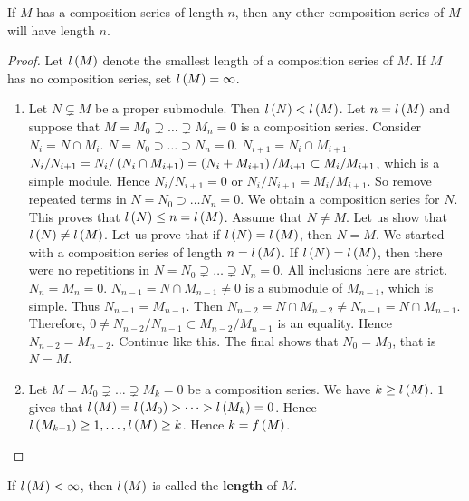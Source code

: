 \begin{proposition}
If $ M $ has a composition series of length $ n $, then any other composition series of $ M $ will have length $ n $.
\end{proposition}

\begin{proof}
Let $ l\left( M \right) $ denote the smallest length of a composition series of $ M $. If $ M $ has no composition series, set $ l\left( M \right) = \infty $.
\begin{enumerate}
\item Let $ N \subsetneq M $ be a proper submodule. Then $ l\left( N \right) < l\left( M \right) $. Let $ n = l\left( M \right) $ and suppose that $ M = M_0 \supsetneq \dots \supsetneq M_n = 0 $ is a composition series. Consider $ N_i = N \cap M_i $. $ N = N_0 \supset \dots \supset N_n = 0 $. $ N_{i + 1} = N_i \cap M_{i + 1} $. $ N_i / N_{i + 1} = N_i / \left( N_i \cap M_{i + 1} \right) = \left( N_i + M_{i + 1} \right) / M_{i + 1} \subset M_i / M_{i + 1} $, which is a simple module. Hence $ N_i / N_{i + 1} = 0 $ or $ N_i / N_{i + 1} = M_i / M_{i + 1} $. So remove repeated terms in $ N = N_0 \supset \dots N_n = 0 $. We obtain a composition series for $ N $. This proves that $ l\left( N \right) \le n = l\left( M \right) $. Assume that $ N \ne M $. Let us show that $ l\left( N \right) \ne l\left( M \right) $. Let us prove that if $ l\left( N \right) = l\left( M \right) $, then $ N = M $. We started with a composition series of length $ n = l\left( M \right) $. If $ l\left( N \right) = l\left( M \right) $, then there were no repetitions in $ N = N_0 \supsetneq \dots \supsetneq N_n = 0 $. All inclusions here are strict. $ N_n = M_n = 0 $. $ N_{n - 1} = N \cap M_{n - 1} \ne 0 $ is a submodule of $ M_{n - 1} $, which is simple. Thus $ N_{n - 1} = M_{n - 1} $. Then $ N_{n - 2} = N \cap M_{n - 2} \ne N_{n - 1} = N \cap M_{n - 1} $. Therefore, $ 0 \ne N_{n - 2} / N_{n - 1} \subset M_{n - 2} / M_{n - 1} $ is an equality. Hence $ N_{n - 2} = M_{n - 2} $. Continue like this. The final shows that $ N_0 = M_0 $, that is $ N = M $.
\item Let $ M = M_0 \supsetneq \dots \supsetneq M_k = 0 $ be a composition series. We have $ k \ge l\left( M \right) $. $ 1 $ gives that $ l\left( M \right) = l\left( M_0 \right) > \dots > l\left( M_k \right) = 0 $. Hence $ l\left( M_{k - 1} \right) \ge 1, \dots, l\left( M \right) \ge k $. Hence $ k = f\left( M \right) $.
\end{enumerate}
\end{proof}

\begin{definition}
If $ l\left( M \right) < \infty $, then $ l\left( M \right) $ is called the \textbf{length} of $ M $.
\end{definition}

